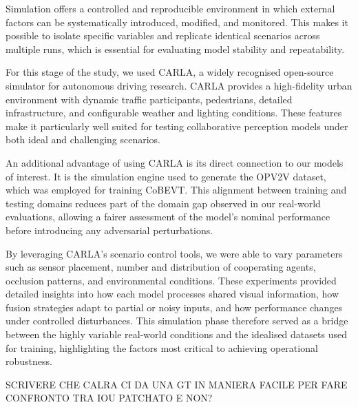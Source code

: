 Simulation offers a controlled and reproducible environment in which external factors can be systematically introduced, modified, and monitored.
This makes it possible to isolate specific variables and replicate identical scenarios across multiple runs, which is essential for evaluating model stability and repeatability.

For this stage of the study, we used CARLA\cite{Dosovitskiy17}, a widely recognised open-source simulator for autonomous driving research.
CARLA provides a high-fidelity urban environment with dynamic traffic participants, pedestrians, detailed infrastructure, and configurable weather and lighting conditions.
These features make it particularly well suited for testing collaborative perception models under both ideal and challenging scenarios.

An additional advantage of using CARLA is its direct connection to our models of interest.
It is the simulation engine used to generate the OPV2V dataset\cite{xu2022opv2vopenbenchmarkdataset}, which was employed for training CoBEVT.
This alignment between training and testing domains reduces part of the domain gap observed in our real-world evaluations, allowing a fairer assessment of the model’s nominal performance before introducing any adversarial perturbations.

By leveraging CARLA’s scenario control tools, we were able to vary parameters such as sensor placement, number and distribution of cooperating agents, occlusion patterns, and environmental conditions.
These experiments provided detailed insights into how each model processes shared visual information, how fusion strategies adapt to partial or noisy inputs, and how performance changes under controlled disturbances.
This simulation phase therefore served as a bridge between the highly variable real-world conditions and the idealised datasets used for training, highlighting the factors most critical to achieving operational robustness.

SCRIVERE CHE CALRA CI DA UNA GT IN MANIERA FACILE PER FARE CONFRONTO TRA IOU PATCHATO E NON?